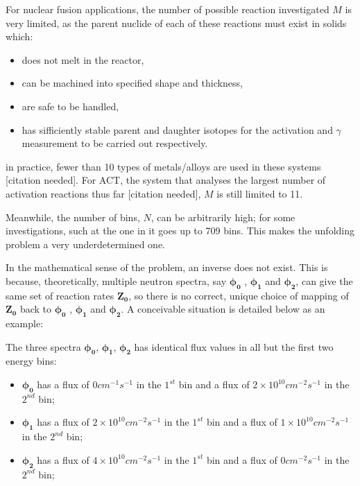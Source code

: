 \documentclass[a4paper, 12pt]{article}
\newcommand{\ve}[1]{\boldsymbol{#1}}
\begin{document}
For nuclear fusion applications, the number of possible reaction investigated $M$ is very limited, as the parent nuclide of each of these reactions must exist in solids which:
\begin{itemize}
    \item does not melt in the reactor,
    \item can be machined into specified shape and thickness,
    \item are safe to be handled,
    \item has sifficiently stable parent and daughter isotopes for the activation and $\gamma$ measurement to be carried out respectively.
\end{itemize}
in practice, fewer than 10 types of metals/alloys are used in these systems [citation needed]. %
For ACT, %
the system that analyses the largest number of activation reactions thus far [citation needed], %
$M$ is still limited to 11. 

Meanwhile, the number of bins, $N$, can be arbitrarily high; for some investigations, such at the one in \cite{EmbargoPaper_LWP} it goes up to 709 bins. 
This makes the unfolding problem a very underdetermined one.

In the mathematical sense of the problem, an inverse does not exist. This is because, theoretically, multiple neutron spectra, say $\ve{\phi_0}$ , $\ve{\phi_1}$ and $\ve{\phi_2}$, can give the same set of reaction rates $\ve{Z_0}$, so there is no correct, unique choice of mapping of $\ve{Z_0}$ back to $\ve{\phi_0}$ , $\ve{\phi_1}$ and $\ve{\phi_2}$. \cite{BirminghamUnfolding} A conceivable situation is detailed below as an example:

The three spectra $\ve{\phi_0}$, $\ve{\phi_1}$, $\ve{\phi_2}$ has identical flux values in all but the first two energy bins:

\begin{itemize}
    \item $\ve{\phi_0}$ has a flux of $0                cm^{-1} s^{-1}$ in the $1^{st}$ bin and a flux of $2 \times 10^{10} cm^{-2} s^{-1}$ in the $2^{nd}$ bin;
    \item $\ve{\phi_1}$ has a flux of $2 \times 10^{10} cm^{-2} s^{-1}$ in the $1^{st}$ bin and a flux of $1 \times 10^{10} cm^{-2} s^{-1}$ in the $2^{nd}$ bin;
    \item $\ve{\phi_2}$ has a flux of $4 \times 10^{10} cm^{-2} s^{-1}$ in the $1^{st}$ bin and a flux of $0                cm^{-2} s^{-1}$ in the $2^{nd}$ bin;
\end{itemize}
\end{document}

